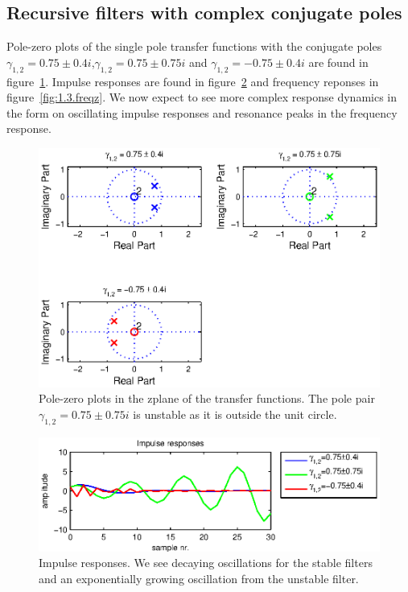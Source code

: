 \subsection{Recursive filters with complex conjugate poles}
Pole-zero plots of the single pole transfer functions with the conjugate poles \(\gamma_{1,2}=0.75\pm0.4i\),\(\gamma_{1,2}=0.75\pm0.75i\) and \(\gamma_{1,2}=-0.75\pm0.4i\) are found in figure~\ref{fig:1.3.zplane}.
Impulse responses are found in figure~\ref{fig:1.3.impz} and frequency reponses in figure~\ref{fig:1.3.freqz}.
We now expect to see more complex response dynamics in the form on oscillating impulse responses and resonance peaks in the frequency response.

\begin{figure}
	\center
	\includegraphics{./picture/ha6_1_3_zplane.eps}
	\caption{Pole-zero plots in the zplane of the transfer functions. The pole pair\(\gamma_{1,2}=0.75\pm0.75i\) is unstable as it is outside the unit circle.}
	\label{fig:1.3.zplane}
\end{figure}

\begin{figure}
	\center
	\includegraphics{./picture/ha6_1_3_impz.eps}
	\caption{Impulse responses. We see decaying oscillations for the stable filters and an exponentially growing oscillation from the unstable filter.}
	\label{fig:1.3.impz}
\end{figure}

